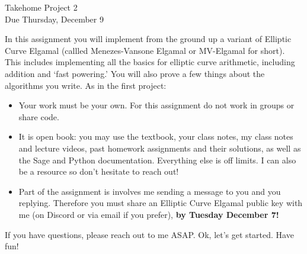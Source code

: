 \documentclass[11pt]{article}
\begin{document}
\begin{center}
\Large {Takehome Project 2}\\
\small {Due Thursday, December 9}
\end{center}
In this assignment you will implement from the ground up a variant of Elliptic Curve Elgamal (callled Menezes-Vansone Elgamal or MV-Elgamal for short).  This includes implementing all the basics for elliptic curve arithmetic, including addition and `fast powering.'  You will also prove a few things about the algorithms you write.  As in the first project:
\begin{itemize}
  \item{Your work must be your own.  For this assignment do not work in groups or share code.}
  \item{It is open book: you may use the textbook, your class notes, my class notes and lecture videos, past homework assignments and their solutions, as well as the Sage and Python documentation.  Everything else is off limits.  I can also be a resource so don't hesitate to reach out!}
  \item{Part of the assignment is involves me sending a message to you and you replying.  Therefore you must share an Elliptic Curve Elgamal public key with me (on Discord or via email if you prefer), \textbf{by Tuesday December 7!}}
\end{itemize}
If you have questions, please reach out to me ASAP.  Ok, let's get started.  Have fun!
\end{document}
